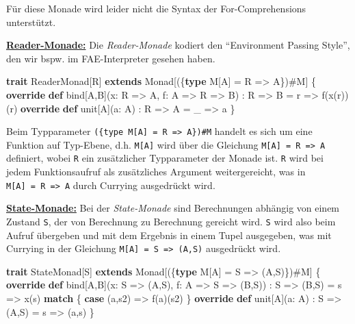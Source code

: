 \documentclass[]{article}
\newenvironment{Shaded}{}{}
\newcommand{\DataTypeTok}[1]{\textcolor[rgb]{0.56,0.13,0.00}{#1}}
\newcommand{\FunctionTok}[1]{\textcolor[rgb]{0.02,0.16,0.49}{#1}}
\newcommand{\KeywordTok}[1]{\textcolor[rgb]{0.00,0.44,0.13}{\textbf{#1}}}
\newcommand{\NormalTok}[1]{#1}
\begin{document}
Für diese Monade wird leider nicht die Syntax der For-Comprehensions
unterstützt.

\underline{\textbf{Reader-Monade:}} Die \emph{Reader-Monade} kodiert den
``Environment Passing Style'', den wir bspw. im FAE-Interpreter gesehen
haben.

\begin{Shaded}
\begin{Highlighting}[]
\KeywordTok{trait}\NormalTok{ ReaderMonad[R] }\KeywordTok{extends}\NormalTok{ Monad[(\{}\KeywordTok{type}\NormalTok{ M[A] = R =\textgreater{} A\})\#M] \{}
  \KeywordTok{override} \KeywordTok{def}\NormalTok{ bind[A,B](x: R =\textgreater{} A, f: A =\textgreater{} R =\textgreater{} B) : R =\textgreater{} B = r =\textgreater{} }\FunctionTok{f}\NormalTok{(}\FunctionTok{x}\NormalTok{(r))(r)}
  \KeywordTok{override} \KeywordTok{def} \DataTypeTok{unit}\NormalTok{[A](a: A) : R =\textgreater{} A = \_ =\textgreater{} a}
\NormalTok{\}}
\end{Highlighting}
\end{Shaded}

Beim Typparameter
\texttt{(\{type\ M{[}A{]}\ =\ R\ =\textgreater{}\ A\})\#M} handelt es
sich um eine Funktion auf Typ-Ebene, d.h. \texttt{M{[}A{]}} wird über
die Gleichung \texttt{M{[}A{]}\ =\ R\ =\textgreater{}\ A} definiert,
wobei \texttt{R} ein zusätzlicher Typparameter der Monade ist.
\texttt{R} wird bei jedem Funktionsaufruf als zusätzliches Argument
weitergereicht, was in \texttt{M{[}A{]}\ =\ R\ =\textgreater{}\ A} durch
Currying ausgedrückt wird.

\underline{\textbf{State-Monade:}} Bei der \emph{State-Monade} sind Berechnungen
abhängig von einem Zustand \texttt{S}, der von Berechnung zu Berechnung
gereicht wird. \texttt{S} wird also beim Aufruf übergeben und mit dem
Ergebnis in einem Tupel ausgegeben, was mit Currying in der Gleichung
\texttt{M{[}A{]}\ =\ S\ =\textgreater{}\ (A,S)} ausgedrückt wird.

\begin{Shaded}
\begin{Highlighting}[]
\KeywordTok{trait}\NormalTok{ StateMonad[S] }\KeywordTok{extends}\NormalTok{ Monad[(\{}\KeywordTok{type}\NormalTok{ M[A] = S =\textgreater{} (A,S)\})\#M] \{}
  \KeywordTok{override} \KeywordTok{def}\NormalTok{ bind[A,B](x: S =\textgreater{} (A,S), f: A =\textgreater{} S =\textgreater{} (B,S)) : S =\textgreater{} (B,S) = }
\NormalTok{      s =\textgreater{} }\FunctionTok{x}\NormalTok{(s) }\KeywordTok{match}\NormalTok{ \{ }\KeywordTok{case}\NormalTok{ (a,s2) =\textgreater{} }\FunctionTok{f}\NormalTok{(a)(s2) \}}
  \KeywordTok{override} \KeywordTok{def} \DataTypeTok{unit}\NormalTok{[A](a: A) : S =\textgreater{} (A,S) = s =\textgreater{} (a,s)}
\NormalTok{\}}
\end{Highlighting}
\end{Shaded}
\end{document}
